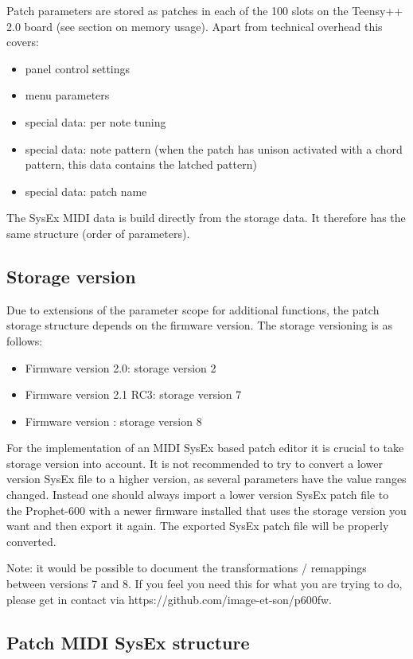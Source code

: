 Patch parameters are stored as patches in each of the 100 slots on the Teensy++ 2.0 board (see section on memory usage). Apart from technical overhead this covers:
\begin{itemize}
  \item panel control settings
  \item menu parameters
  \item special data: per note tuning
  \item special data: note pattern (when the patch has unison activated with a chord pattern, this data contains the latched pattern) 
  \item special data: patch name 
\end{itemize}

The SysEx MIDI data is build directly from the storage data. It therefore has the same structure (order of parameters). 

\subsection{Storage version}

Due to extensions of the parameter scope for additional functions, the patch storage structure depends on the firmware version. The storage versioning is as follows:

\begin{itemize}
  \item Firmware version 2.0: storage version 2
  \item Firmware version 2.1 RC3: storage version 7
  \item Firmware version \version: storage version 8  
\end{itemize}

For the implementation of an MIDI SysEx based patch editor it is crucial to take storage version into account. It is not recommended to try to convert a lower version SysEx file to a higher version, as several parameters have the value ranges changed. Instead one should always import a lower version SysEx patch file to the Prophet-600 with a newer firmware installed that uses the storage version you want and then export it again. The exported SysEx patch file will be properly converted. 

Note: it would be possible to document the transformations / remappings between versions 7 and 8. If you feel you need this for what you are trying to do, please get in contact via https://github.com/image-et-son/p600fw.

\subsection{Patch MIDI SysEx structure}

